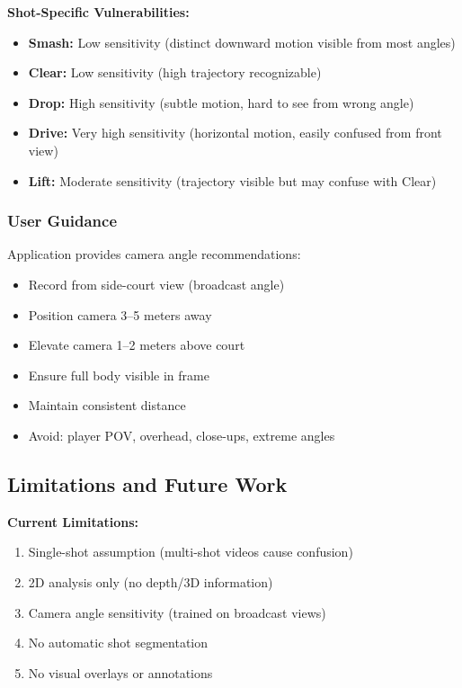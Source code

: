 \documentclass[12pt,a4paper]{article}
\begin{document}
\textbf{Shot-Specific Vulnerabilities:}

\begin{itemize}
\item \textbf{Smash:} Low sensitivity (distinct downward motion visible from most angles)
\item \textbf{Clear:} Low sensitivity (high trajectory recognizable)
\item \textbf{Drop:} High sensitivity (subtle motion, hard to see from wrong angle)
\item \textbf{Drive:} Very high sensitivity (horizontal motion, easily confused from front view)
\item \textbf{Lift:} Moderate sensitivity (trajectory visible but may confuse with Clear)
\end{itemize}

\subsubsection{User Guidance}

Application provides camera angle recommendations:

\begin{itemize}
\item Record from side-court view (broadcast angle)
\item Position camera 3--5 meters away
\item Elevate camera 1--2 meters above court
\item Ensure full body visible in frame
\item Maintain consistent distance
\item Avoid: player POV, overhead, close-ups, extreme angles
\end{itemize}

\subsection{Limitations and Future Work}

\textbf{Current Limitations:}
\begin{enumerate}
\item Single-shot assumption (multi-shot videos cause confusion)
\item 2D analysis only (no depth/3D information)
\item Camera angle sensitivity (trained on broadcast views)
\item No automatic shot segmentation
\item No visual overlays or annotations
\end{enumerate}
\end{document}
